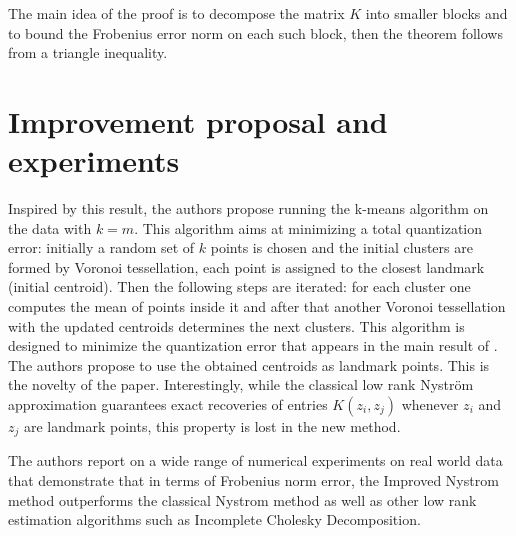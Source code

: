 \documentclass{article}
\begin{document}
The main idea of the proof is to decompose the matrix $K$ into smaller blocks and to bound the Frobenius error norm on each such block, then the theorem follows from a triangle inequality.

\section{Improvement proposal and experiments}

Inspired by this result, the authors propose running the k-means algorithm on the data with $k=m$. This algorithm aims at minimizing a total quantization error: initially a random set of $k$ points is chosen and the initial clusters are formed by Voronoi tessellation, each point is assigned to the closest landmark (initial centroid). Then the following steps are iterated: for each cluster one computes the mean of points inside it and after that another Voronoi tessellation with the updated centroids determines the next clusters. This algorithm is designed to minimize the quantization error that appears in the main result of \cite{10.1145/1390156.1390311}. The authors propose to use the obtained centroids as landmark points. This is the novelty of the paper. Interestingly, while the classical low rank Nyström approximation guarantees exact recoveries of entries $K(z_i,z_j)$ whenever $z_i$ and $z_j$ are landmark points, this property is lost in the new method.

\newline

The authors report on a wide range of numerical experiments on real world data that demonstrate that in terms of Frobenius norm error, the Improved Nystrom method outperforms the classical Nystrom method as well as other low rank estimation algorithms such as Incomplete Cholesky Decomposition.

\printbibliography{}
\nocite{*}
\end{document}
